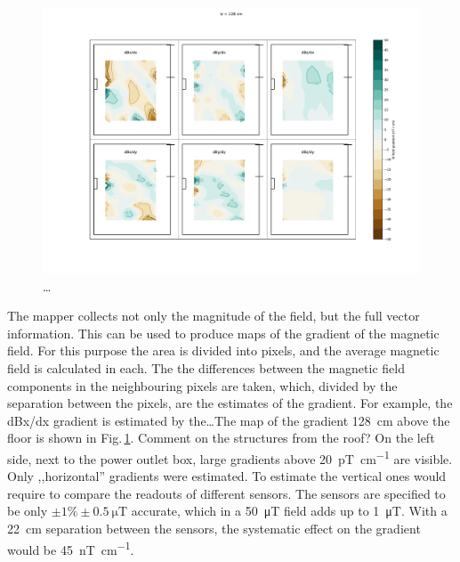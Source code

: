 \begin{figure}
  \centering
  \includegraphics[width=\linewidth]{gfx/mapping/lpsc/bastille_crane_away_rep_gradient_139cm.pdf}
  \caption{\ldots}
  \label{fig:mapping_bastille_gradient}
\end{figure}

The mapper collects not only the magnitude of the field, but the full vector information. This can be used to produce maps of the gradient of the magnetic field. For this purpose the area is divided into pixels, and the average magnetic field is calculated in each.
The the differences between the magnetic field components in the neighbouring pixels are taken, which, divided by the separation between the pixels, are the estimates of the gradient.
For example, the dBx/dx gradient is estimated by the\ldots The map of the gradient \SI{128}{\centi\meter} above the floor is shown in Fig.\,\ref{fig:mapping_bastille_gradient}. Comment on the structures from the roof? On the left side, next to the power outlet box, large gradients above \SI[per-mode=symbol]{20}{\pico\tesla\per\centi\meter} are visible. Only ,,horizontal'' gradients were estimated.
To estimate the vertical ones would require to compare the readouts of different sensors. The sensors are specified to be only $\pm 1\% \pm \SI{0.5}{\micro\tesla}$ accurate, which in a \SI{50}{\micro\tesla} field adds up to \SI{1}{\micro\tesla}. With a \SI{22}{\centi\meter} separation between the sensors, the systematic effect on the gradient would be \SI[per-mode=symbol]{45}{\nano\tesla\per\centi\meter}.

